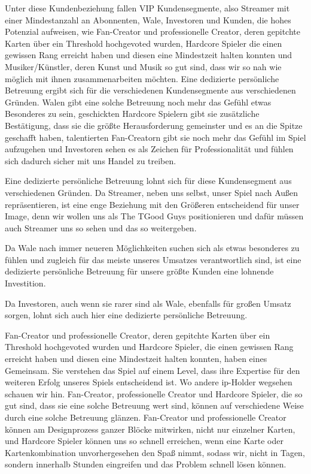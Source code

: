 \documentclass[fontsize=11, a4aper]{scrartcl}
\begin{document}
Unter diese Kundenbeziehung fallen VIP Kundensegmente, also Streamer mit einer Mindestanzahl an Abonnenten, Wale, Investoren und Kunden, die hohes Potenzial aufweisen, wie Fan-Creator und professionelle Creator, deren gepitchte Karten über ein Threshold hochgevoted wurden, Hardcore Spieler die einen gewissen Rang erreicht haben und diesen eine Mindestzeit halten konnten und Musiker/Künstler, deren Kunst und Musik so gut sind, dass wir so nah wie möglich mit ihnen zusammenarbeiten möchten. Eine dedizierte persönliche Betreuung ergibt sich für die verschiedenen Kundensegmente aus verschiedenen Gründen. Walen gibt eine solche Betreuung noch mehr das Gefühl etwas Besonderes zu sein, geschickten Hardcore Spielern gibt sie zusätzliche Bestätigung, dass sie die größte Herausforderung gemeinster und es an die Spitze geschafft haben, talentierten Fan-Creatorn gibt sie noch mehr das Gefühl im Spiel aufzugehen und Investoren sehen es als Zeichen für Professionalität und fühlen sich dadurch sicher mit uns Handel zu treiben.\hfill\newline

\noindent Eine dedizierte persönliche Betreuung lohnt sich für diese Kundensegment aus verschiedenen Gründen. Da Streamer, neben uns selbst, unser Spiel nach Außen repräsentieren, ist eine enge Beziehung mit den Größeren entscheidend für unser Image, denn wir wollen uns als \glqq The TGood Guys\grqq{} positionieren und dafür müssen auch Streamer uns so sehen und das so weitergeben.\hfill\newline

\noindent Da Wale nach immer neueren Möglichkeiten suchen sich als etwas besonderes zu fühlen und zugleich für das meiste unseres Umsatzes verantwortlich sind, ist eine dedizierte persönliche Betreuung für unsere größte Kunden eine lohnende Investition.\hfill\newline

\noindent Da Investoren, auch wenn sie rarer sind als Wale, ebenfalls für großen Umsatz sorgen, lohnt sich auch hier eine dedizierte persönliche Betreuung.\hfill\newline

\noindent Fan-Creator und professionelle Creator, deren gepitchte Karten über ein Threshold hochgevoted wurden und Hardcore Spieler, die einen gewissen Rang erreicht haben und diesen eine Mindestzeit halten konnten, haben eines Gemeinsam. Sie verstehen das Spiel auf einem Level, dass ihre Expertise für den weiteren Erfolg unseres Spiels entscheidend ist. Wo andere \ac{ip}-Holder wegsehen schauen wir hin. Fan-Creator, professionelle Creator und Hardcore Spieler, die so gut sind, dass sie eine solche Betreuung wert sind, können auf verschiedene Weise durch eine solche Betreuung glänzen. Fan-Creator und professionelle Creator können am Designprozess ganzer Blöcke mitwirken, nicht nur einzelner Karten, und Hardcore Spieler können uns so schnell erreichen, wenn eine Karte oder Kartenkombination unvorhergesehen den Spaß nimmt, sodass wir, nicht in Tagen, sondern innerhalb Stunden eingreifen und das Problem schnell lösen können.
\end{document}
